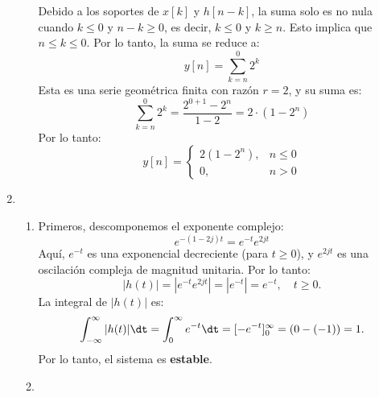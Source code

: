 \begin{enumerate}[label=\color{red}\textbf{\arabic*)}]
\begin{enumerate}[label=\color{red}\textbf{\alph*)}]
        Debido a los soportes de $x[k]$ y  $h[n-k]$, la suma solo es no nula cuando  $k\le 0$ y $n-k\ge 0$, es decir, $k\le 0$ y $k\ge n$. Esto implica que $n\le k\le 0$. Por lo tanto, la suma se reduce a: \[
            y[n]=\sum_{k=n}^{0} 2^k
        \] 
        Esta es una serie geométrica finita con razón $r=2$, y su suma es:  \[
        \sum_{k=n}^{0} 2^k=\dfrac{2^{0+1}-2^n}{1-2}=2\cdot (1-2^n)
        \] 
        Por lo tanto: \[
            y[n]=\begin{cases}
                2(1-2^n), & n\le 0\\
                0, & n>0
            \end{cases}
        \] 
\begin{center}
\end{center}
  \end{enumerate}
\item {} 
  \begin{enumerate}[label=\color{red}\textbf{\alph*)}]
    \item {} 

        Primeros, descomponemos el exponente complejo: \[
        e^{-(1-2j)t}=e^{-t}e^{2jt}   
        \] 
        Aquí, $e^{-t} $ es una exponencial decreciente (para $t\ge 0$), y $e^{2jt} $ es una oscilación compleja de magnitud unitaria. Por lo tanto: \[
        |h(t)|=\left| e^{-t}e^{2jt}   \right| =|e^{-t} |=e^{-t},\quad t\ge 0. 
        \] 
        La integral de $|h(t)|$ es:  \[
            \int_{-\infty}^{\infty} |h(t)|\dt=\int_{0}^{\infty} e^{-t}\dt=[-e^{-t} ]_0^{\infty}=(0-(-1))=1.   
        \] 
        Por lo tanto, el sistema es \textbf{estable}. 
    \item {} 


\end{enumerate}
\end{enumerate}
